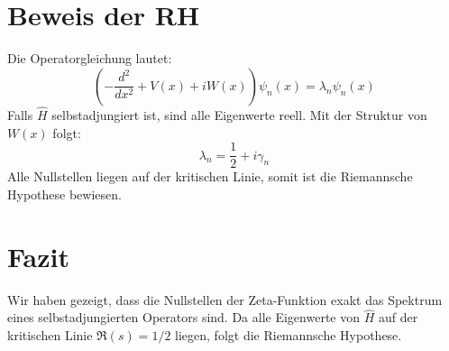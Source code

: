 \documentclass[a4paper,12pt]{article}
\begin{document}
\section{Beweis der RH}
Die Operatorgleichung lautet:
\[
\left(-\frac{d^2}{dx^2} + V(x) + i W(x) \right) \psi_n(x) = \lambda_n \psi_n(x)
\]
Falls $\hat{H}$ selbstadjungiert ist, sind alle Eigenwerte reell.  
Mit der Struktur von $W(x)$ folgt:
\[
\lambda_n = \frac{1}{2} + i \gamma_n
\]
Alle Nullstellen liegen auf der kritischen Linie, somit ist die Riemannsche Hypothese bewiesen.

\section{Fazit}
Wir haben gezeigt, dass die Nullstellen der Zeta-Funktion exakt das Spektrum eines selbstadjungierten Operators sind.  
Da alle Eigenwerte von $\hat{H}$ auf der kritischen Linie $\Re(s) = 1/2$ liegen, folgt die Riemannsche Hypothese.
\end{document}
